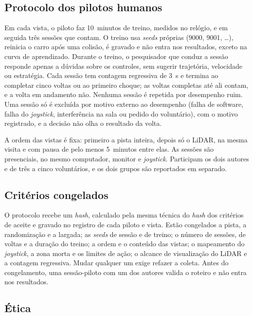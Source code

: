 \subsection{Protocolo dos pilotos humanos}

Em cada vista, o piloto faz 10~minutos de treino, medidos no relógio, e em seguida
três sessões que contam. O treino usa \textit{seeds} próprias (9000, 9001, \dots),
reinicia o carro após uma colisão, é gravado e não entra nos resultados, exceto na
curva de aprendizado. Durante o treino, o pesquisador que conduz a sessão responde apenas a dúvidas sobre
os controles, sem sugerir trajetória, velocidade ou estratégia. Cada sessão tem
contagem regressiva de 3~s e termina ao completar cinco voltas ou ao primeiro
choque; as voltas completas até ali contam, e a volta em andamento não. Nenhuma
sessão é repetida por desempenho ruim. Uma sessão só é excluída por motivo externo
ao desempenho (falha de software, falha do \textit{joystick}, interferência na
sala ou pedido do voluntário), com o motivo registrado, e a decisão não olha o
resultado da volta.

A ordem das vistas é fixa: primeiro a pista inteira, depois só o LiDAR, na mesma
visita e com pausa de pelo menos 5~minutos entre elas. As sessões são presenciais,
no mesmo computador, monitor e \textit{joystick}. Participam os dois autores e de
três a cinco voluntários, e os dois grupos são reportados em separado.

\subsection{Critérios congelados}

O protocolo recebe um \textit{hash}, calculado pela mesma técnica do \textit{hash}
dos critérios de aceite e gravado no registro de cada piloto e vista. Estão
congelados a pista, a randomização e a largada; as \textit{seeds} de sessão e de
treino; o número de sessões, de voltas e a duração do treino; a ordem e o conteúdo
das vistas; o mapeamento do \textit{joystick}, a zona morta e os limites de ação;
o alcance de visualização do LiDAR e a contagem regressiva. Mudar qualquer um
exige refazer a coleta. Antes do congelamento, uma sessão-piloto com um dos autores
valida o roteiro e não entra nos resultados.

\subsection{Ética}

